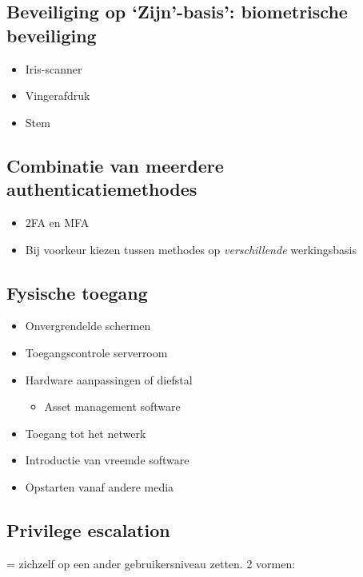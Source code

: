 \documentclass{article}
\begin{document}
\subsection{Beveiliging op `Zijn'-basis': biometrische beveiliging}

\begin{itemize}
    \item Iris-scanner
    \item Vingerafdruk
    \item Stem
\end{itemize}

\subsection{Combinatie van meerdere authenticatiemethodes}

\begin{itemize}
    \item 2FA en MFA
    \item Bij voorkeur kiezen tussen methodes op \textit{verschillende} werkingsbasis
\end{itemize}

\subsection{Fysische toegang}

\begin{itemize}
    \item Onvergrendelde schermen
    \item Toegangscontrole serverroom
    \item Hardware aanpassingen of diefstal
    \begin{itemize}
        \item Asset management software
    \end{itemize}
    \item Toegang tot het netwerk
    \item Introductie van vreemde software
    \item Opstarten vanaf andere media
\end{itemize}

\subsection{Privilege escalation}

= zichzelf op een ander gebruikersniveau zetten. 2 vormen:
\end{document}
